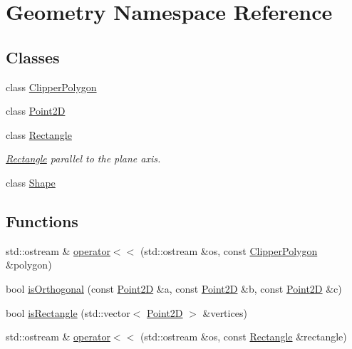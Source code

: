\hypertarget{namespaceGeometry}{}\section{Geometry Namespace Reference}
\label{namespaceGeometry}
\subsection*{Classes}
\begin{DoxyCompactItemize}
\item 
class \hyperlink{classGeometry_1_1ClipperPolygon}{Clipper\+Polygon}
\item 
class \hyperlink{classGeometry_1_1Point2D}{Point2\+D}
\item 
class \hyperlink{classGeometry_1_1Rectangle}{Rectangle}
\begin{DoxyCompactList}\small\item\em \hyperlink{classGeometry_1_1Rectangle}{Rectangle} parallel to the plane axis. \end{DoxyCompactList}\item 
class \hyperlink{classGeometry_1_1Shape}{Shape}
\end{DoxyCompactItemize}
\subsection*{Functions}
\begin{DoxyCompactItemize}
\item 
std\+::ostream \& \hyperlink{namespaceGeometry_a22a5a71e9b20685458a895f1ce751fab}{operator$<$$<$} (std\+::ostream \&os, const \hyperlink{classGeometry_1_1ClipperPolygon}{Clipper\+Polygon} \&polygon)
\item 
bool \hyperlink{namespaceGeometry_a8694892694aaa62c463ea4fb268f0e5e}{is\+Orthogonal} (const \hyperlink{classGeometry_1_1Point2D}{Point2\+D} \&a, const \hyperlink{classGeometry_1_1Point2D}{Point2\+D} \&b, const \hyperlink{classGeometry_1_1Point2D}{Point2\+D} \&c)
\item 
bool \hyperlink{namespaceGeometry_ad19234394b8890f16dd489a33c6d62ca}{is\+Rectangle} (std\+::vector$<$ \hyperlink{classGeometry_1_1Point2D}{Point2\+D} $>$ \&vertices)
\item 
std\+::ostream \& \hyperlink{namespaceGeometry_a41187ad6b2f42115fea347fc93f7992f}{operator$<$$<$} (std\+::ostream \&os, const \hyperlink{classGeometry_1_1Rectangle}{Rectangle} \&rectangle)
\end{DoxyCompactItemize}


